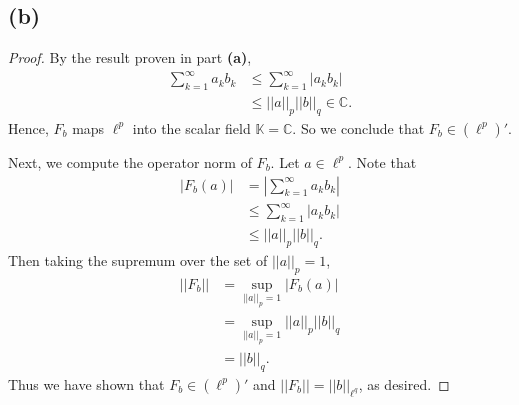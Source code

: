 \documentclass{article}
\begin{document}
\subsection*{(b)}
\begin{proof}
	By the result proven in part \textbf{(a)},
	\begin{align}
		\sum_{k=1}^{\infty} a_k b_k &\leq \sum_{k=1}^{\infty} |a_k b_k| \\
		&\leq ||a||_p||b||_q \in \mathbb{C}.
	\end{align}
	Hence, $F_b$  maps $\ell^p$ into the scalar field $\mathbb{K} = \mathbb{C}$. So we conclude that $F_b\in \left(\ell^p\right)'$. 
	
	Next, we compute the operator norm of $F_b$. Let $a\in\ell^p$. Note that
	\begin{align}
		|F_b(a)|&=\left|\sum_{k=1}^{\infty} a_k b_k \right|\\
		&\leq \sum_{k=1}^{\infty} |a_k b_k| \\
		&\leq ||a||_p ||b||_q.
	\end{align}
	Then taking the supremum over the set of $||a||_p=1$,
	\begin{align}
		||F_b||&=\sup_{||a||_p=1} |F_b(a)| \\
		&= \sup_{||a||_p=1} ||a||_p ||b||_q \\
		&= ||b||_q. 
	\end{align}
	Thus we have shown that $F_b \in \left(\ell^p\right)'$ and $||F_b||=||b||_{\ell^q}$, as desired.
\end{proof}
\end{document}
